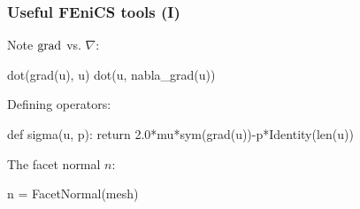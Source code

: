 \begin{frame}[fragile]
  \frametitle{Useful FEniCS tools (I)}

  Note $\operatorname{\mathrm{grad}}$ vs. $\nabla$:
  \vspace{-1em}
  \begin{python}
dot(grad(u), u)
dot(u, nabla_grad(u))
  \end{python}

  \bigskip

  Defining operators:
  \vspace{-1em}
  \begin{python}
def sigma(u, p):
    return 2.0*mu*sym(grad(u))-p*Identity(len(u))
  \end{python}

  \bigskip

  The facet normal $n$:
  \vspace{-1em}
  \begin{python}
n = FacetNormal(mesh)
  \end{python}

\end{frame}
